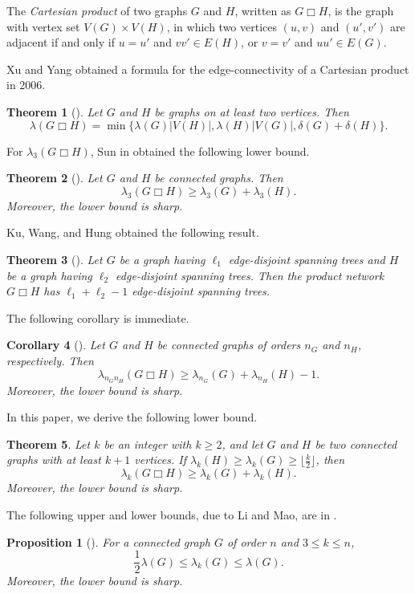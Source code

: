 \documentclass[final]{dmtcs-episciences}
\newtheorem{theorem}{Theorem}[section]
\newtheorem{proposition}{Proposition}[section]
\newtheorem{corollary}[theorem]{Corollary}
\begin{document}
The \emph{Cartesian product} of two graphs $G$ and $H$, written as
$G\Box H$, is the graph with vertex set $V(G)\times V(H)$, in which
two vertices $(u,v)$ and $(u',v')$ are adjacent if and only if
$u=u'$ and $vv'\in E(H)$, or $v=v'$ and $uu'\in E(G)$.

Xu and Yang obtained a formula for the edge-connectivity of a
Cartesian product in 2006.
\begin{theorem}[\cite{XuYang}]\label{Thm:Ramseyn-24m}
Let $G$ and $H$ be graphs on at least two vertices. Then
\[
\lambda(G\Box H)=\min \{\lambda(G) |V(H)|,\lambda(H)
|V(G)|,\delta(G)+\delta(H)\}.
\]
\end{theorem}

For $\lambda_3(G\Box H)$, Sun in \cite{Sun} obtained the following
lower bound.
\begin{theorem}[\cite{Sun}] \label{th7-1-10}
Let $G$ and $H$ be connected graphs. Then
\[
\lambda_3(G\Box H)\geq \lambda_3(G)+\lambda_3(H).
\]
Moreover, the lower bound is sharp.
\end{theorem}


Ku, Wang, and Hung \cite{KuWangHung} obtained the following result.

\begin{theorem}[\cite{KuWangHung}]\label{th7-2-8}
Let $G$ be a graph having $\ell_1$ edge-disjoint spanning trees and
$H$ be a graph having $\ell_2$ edge-disjoint spanning trees. Then
the product network $G\Box H$ has $\ell_1+\ell_2-1$ edge-disjoint
spanning trees.
\end{theorem}

The following corollary is immediate.
\begin{corollary}[\cite{KuWangHung}]\label{cor:ku-wang-hung}
Let $G$ and $H$ be connected graphs of orders $n_G$ and $n_H$,
respectively. Then
\[
\lambda_{n_G n_H}(G\Box H)\geq
\lambda_{n_G}(G)+\lambda_{n_H}(H)-1.
\]
Moreover, the lower bound is sharp.
\end{corollary}

In this paper, we derive the following lower bound.
\begin{theorem}\label{th-Lower}
Let $k$ be an integer with $k\geq 2$, and let $G$ and $H$ be two
connected graphs with at least $k+1$ vertices. If $\lambda_k(H)\geq
\lambda_k(G)\geq \lfloor \frac{k}{2}\rfloor$, then
\[
\lambda_k(G\Box H)\geq \lambda_k(G)+\lambda_k(H).
\]
Moreover, the lower bound is sharp.
\end{theorem}

The following upper and lower bounds, due to Li and Mao, are in
\cite{LiMaoNordhaus}.
\begin{proposition}[\cite{LiMaoNordhaus}]\label{pro1-1}
For a connected graph $G$ of order $n$ and $3\leq k\leq n$,
\[
\frac{1}{2}\lambda(G)\leq \lambda_k(G)\leq \lambda(G).
\]
Moreover, the lower bound is sharp.
\end{proposition}
\end{document}
